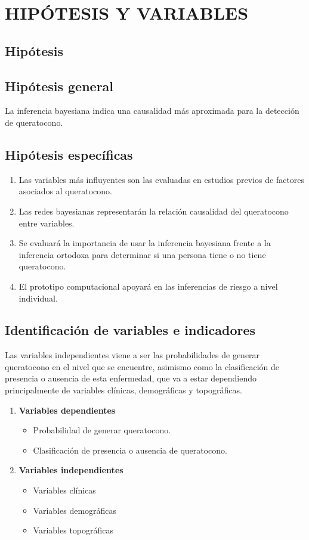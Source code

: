 \newpage
\chapter{HIPÓTESIS Y VARIABLES}
\section{Hipótesis}

\section{Hipótesis general}
La inferencia bayesiana indica una causalidad más aproximada para la detección de queratocono.

\section{Hipótesis específicas}

\begin{enumerate}
    \item Las variables más influyentes son las evaluadas en estudios previos de factores asociados al queratocono.
    \item Las redes bayesianas representarán la relación causalidad del queratocono entre variables.
    \item Se evaluará la importancia de usar la inferencia bayesiana frente a la inferencia ortodoxa para determinar si una persona tiene o no tiene queratocono.
    \item El prototipo computacional apoyará en las inferencias de riesgo a nivel individual.
\end{enumerate}

\section{Identificación de variables e indicadores}

Las variables independientes viene a ser las probabilidades de generar queratocono en el nivel que se encuentre, asimismo como la clasificación de presencia o ausencia de esta enfermedad, que va a estar dependiendo principalmente de variables clínicas, demográficas y topográficas.

\begin{enumerate}
    \item \textbf{Variables dependientes}
    \begin{itemize}
        \item Probabilidad de generar queratocono.
        \item Clasificación de presencia o ausencia de queratocono. 
    \end{itemize}
    \item \textbf{Variables independientes} 
    \begin{itemize}
        \item Variables clínicas
        \item Variables demográficas
        \item Variables topográficas 
    \end{itemize}
\end{enumerate}

